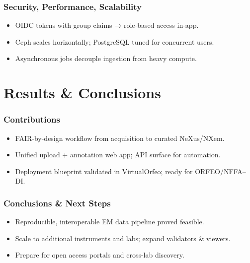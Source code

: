 \documentclass{beamer}
\begin{document}
\begin{frame}
    \frametitle{Security, Performance, Scalability}
    \begin{itemize}
        \item OIDC tokens with group claims → role-based access in-app.
        \item Ceph scales horizontally; PostgreSQL tuned for concurrent users.
        \item Asynchronous jobs decouple ingestion from heavy compute.
    \end{itemize}
\end{frame}

\section{Results \& Conclusions}

\begin{frame}
    \frametitle{Contributions}
    \begin{itemize}
        \item FAIR-by-design workflow from acquisition to curated NeXus/NXem.
        \item Unified upload + annotation web app; API surface for automation.
        \item Deployment blueprint validated in VirtualOrfeo; ready for ORFEO/NFFA–DI.
    \end{itemize}
\end{frame}

\begin{frame}
    \frametitle{Conclusions \& Next Steps}
    \begin{itemize}
        \item Reproducible, interoperable EM data pipeline proved feasible.
        \item Scale to additional instruments and labs; expand validators \& viewers.
        \item Prepare for open access portals and cross-lab discovery.
    \end{itemize}
\end{frame}
\end{document}
